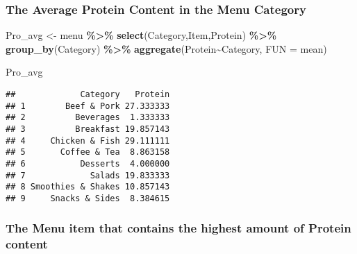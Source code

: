 \documentclass[
]{article}
\newenvironment{Shaded}{\begin{snugshade}}{\end{snugshade}}
\newcommand{\AttributeTok}[1]{\textcolor[rgb]{0.13,0.29,0.53}{#1}}
\newcommand{\FunctionTok}[1]{\textcolor[rgb]{0.13,0.29,0.53}{\textbf{#1}}}
\newcommand{\NormalTok}[1]{#1}
\newcommand{\OtherTok}[1]{\textcolor[rgb]{0.56,0.35,0.01}{#1}}
\newcommand{\SpecialCharTok}[1]{\textcolor[rgb]{0.81,0.36,0.00}{\textbf{#1}}}
\begin{document}
\hypertarget{the-average-protein-content-in-the-menu-category}{%
\subsubsection{The Average Protein Content in the Menu
Category}\label{the-average-protein-content-in-the-menu-category}}

\begin{Shaded}
\begin{Highlighting}[]
\NormalTok{Pro\_avg }\OtherTok{\textless{}{-}}\NormalTok{ menu }\SpecialCharTok{\%\textgreater{}\%} 
  \FunctionTok{select}\NormalTok{(Category,Item,Protein) }\SpecialCharTok{\%\textgreater{}\%} 
  \FunctionTok{group\_by}\NormalTok{(Category) }\SpecialCharTok{\%\textgreater{}\%}
  \FunctionTok{aggregate}\NormalTok{(Protein}\SpecialCharTok{\textasciitilde{}}\NormalTok{Category, }
            \AttributeTok{FUN =}\NormalTok{ mean)}

\NormalTok{Pro\_avg}
\end{Highlighting}
\end{Shaded}

\begin{verbatim}
##             Category   Protein
## 1        Beef & Pork 27.333333
## 2          Beverages  1.333333
## 3          Breakfast 19.857143
## 4     Chicken & Fish 29.111111
## 5       Coffee & Tea  8.863158
## 6           Desserts  4.000000
## 7             Salads 19.833333
## 8 Smoothies & Shakes 10.857143
## 9     Snacks & Sides  8.384615
\end{verbatim}

\hypertarget{the-menu-item-that-contains-the-highest-amount-of-protein-content}{%
\subsubsection{The Menu item that contains the highest amount of Protein
content}\label{the-menu-item-that-contains-the-highest-amount-of-protein-content}}
\end{document}
